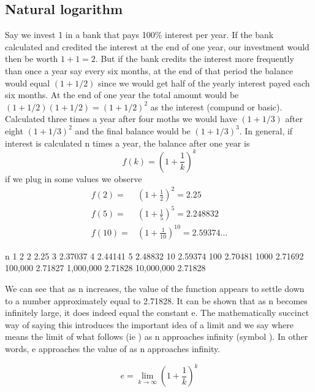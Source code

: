
\subsection{Natural logarithm}
Say we invest 1 in a bank that pays 100\% interest per year. If the bank calculated and credited the interest at the end of one year, our investment would then be worth $1 + 1 = 2$. But if the bank credits the interest more frequently than once a year say every six months, at the end of that period the balance would equal $(1 + 1/2)$ since we would get half of the yearly interest payed each six months. At the end of one year the total amount would be $(1 + 1/2)(1 + 1/2) = (1 + 1/2)^2$ as the interest (compund or basic). Calculated three times a year after four moths we would have $(1 + 1/3)$ after eight $(1 + 1/3)^2$ and the final balance would be $(1 + 1/3)^3$. In general, if interest is calculated n times a year, the balance after one year is
\[
f(k) = \left(1 + \frac{1}{k}\right)^k
\]
if we plug in some values we observe
\[
\begin{align*}
  f(2)  =& \left(1 + \frac{1}{2}\right)^2 = 2.25 \\
  f(5)  =& \left(1 + \frac{1}{5}\right)^5 = 2.248832 \\
  f(10) =& \left(1 + \frac{1}{10}\right)^{10} = 2.59374...
\end{align*}
\]

n 
1 2 
2 2.25 
3 2.37037 
4 2.44141 
5 2.48832 
10 2.59374 
100 2.70481 
1000 2.71692 
100,000 2.71827 
1,000,000 2.71828 
10,000,000 2.71828

We can see that as n increases, the value of the function appears to settle down to a number approximately equal to 2.71828. It can be shown that as n becomes infinitely large, it does indeed equal the constant e. The mathematically succinct way of saying this introduces the important idea of a limit and we say where means the limit of what follows (ie ) as n approaches infinity (symbol ). In other words, e approaches the value of as n approaches infinity.

\begin{equation}
e = \lim_{k\to\infty}\left(1 + \frac{1}{k}\right)^k
\end{equation}

